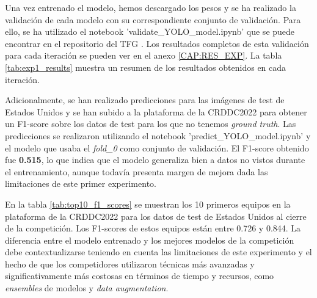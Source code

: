 Una vez entrenado el modelo, hemos descargado los pesos y se ha realizado la validación de cada modelo con su correspondiente conjunto de validación. Para ello, se ha utilizado el notebook 'validate\_YOLO\_model.ipynb' que se puede encontrar en el repositorio del TFG \cite{TFG_Repository}. Los resultados completos de esta validación para cada iteración se pueden ver en el anexo \ref{CAP:RES_EXP}. La tabla \ref{tab:exp1_results} muestra un resumen de los resultados obtenidos en cada iteración.

\begin{table}[H]
    \centering
    \caption{Resultados obtenidos en cada iteración del experimento 1.}
    \label{tab:exp1_results}
\end{table}

Adicionalmente, se han realizado predicciones para las imágenes de test de Estados Unidos y se han subido a la plataforma de la CRDDC2022 para obtener un F1-score sobre los datos de test para los que no tenemos \textit{ground truth}. Las predicciones se realizaron utilizando el notebook 'predict\_YOLO\_model.ipynb' y el modelo que usaba el \textit{fold\_0} como conjunto de validación. El F1-score obtenido fue \textbf{0.515}, lo que indica que el modelo generaliza bien a datos no vistos durante el entrenamiento, aunque todavía presenta margen de mejora dada las limitaciones de este primer experimento.

En la tabla \ref{tab:top10_f1_scores} se muestran los 10 primeros equipos en la plataforma de la CRDDC2022 para los datos de test de Estados Unidos al cierre de la competición. Los F1-scores de estos equipos están entre 0.726 y 0.844. La diferencia entre el modelo entrenado y los mejores modelos de la competición debe contextualizarse teniendo en cuenta las limitaciones de este experimento y el hecho de que los competidores utilizaron técnicas más avanzadas y significativamente más costosas en términos de tiempo y recursos, como \textit{ensembles} de modelos y \textit{data augmentation}.

